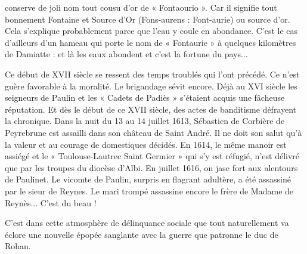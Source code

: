 conserve de joli nom tout cousu d'or de « Fontaourio ».
Car il signifie tout bonnement Fontaine et Source d'Or
(Fons-aurens : Font-aurie) ou source d'or. Cela s'explique
probablement parce que l'eau y coule en abondance. C'est
le cas d'ailleurs d'un hameau qui porte le nom de
« Fontaurie » à quelques kilomètres de Damiatte : et là les
eaux abondent et c'est la fortune du pays...

\par

Ce début de XVII\ieme{} siècle se ressent des temps troublés
qui l'ont précédé. Ce n'est guère favorable à la moralité.
Le brigandage sévit encore. Déjà au XVI\ieme{} siècle les
seigneurs de Paulin et les « Cadets de Padiès » s'étaient
acquis une fâcheuse réputation. Et dès le début de ce
XVII\ieme{} siècle, des actes de banditisme défrayent la
chronique. Dans la nuit du 13 au 14 juillet 1613,
Sébastien de Corbière de Peyrebrune est assailli dans
son château de Saint André. Il ne doit son salut qu'à la
valeur et au courage de domestiques décidés. En 1614,
le même manoir est assiégé et le « Toulouse-Lautrec
Saint Germier » qui s'y est réfugié, n'est délivré que par
les troupes du diocèse d'Albi. En juillet 1616, on jase fort
aux alentours de Paulinet. Le vicomte de Paulin, surpris
en flagrant adultère, a été assassiné par le sieur de Reynes.
Le mari trompé assassine encore le frère de Madame de
Reynès... C'est du beau !

\par

C'est dans cette atmosphère de délinquance sociale que
tout naturellement va éclore une nouvelle épopée
sanglante avec la guerre que patronne le duc de Rohan.